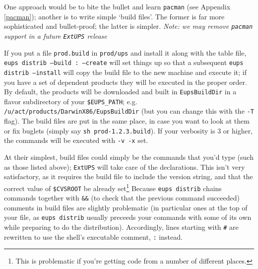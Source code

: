 \documentclass{article}
\newcommand{\code}[1]{\texttt{#1}}
\newcommand{\eups}{\code{ExtUPS}}
\newcommand{\pacman}{\code{pacman}}
\begin{document}
One approach would be to bite the bullet and learn \pacman{} (see Appendix \ref{pacman});
another is to write simple `build files'.  The former is far more sophisticated
and bullet-proof; the latter is simpler.
\textit{Note: we may remove \pacman{} support in a future \eups{} release}

If you put a file \code{prod.build} in \code{prod/ups} and install it along
with the table file, \code{eups distrib --build : --create} will set things up
so that a subsequent \code{eups distrib --install} will copy the build file
to the new machine and execute it;  if you have a set of dependent products
they will be executed in the proper order.  By default, the products will be downloaded
and built in \code{EupsBuildDir} in a flavor subdirectory of your \code{\$EUPS\_PATH};
e.g. \code{/u/act/products/DarwinX86/EupsBuildDir} (but you can change this with
the \code{-T} flag). The build files are put in the same place, in case you want
to look at them or fix buglets (simply say \code{sh prod-1.2.3.build}).  If your
verbosity is 3 or higher, the commands will be executed with \code{-v -x} set.

At their simplest, build files could simply
be the commands that you'd type (such as those listed above); \eups{} will take
care of the declarations.  This isn't very satisfactory, as it requires the
build file to include the version string, and that the correct value of \code{\$CVSROOT}
be already set\footnote{This is problematic if you're getting code from a number
  of different places.}
Because \code{eups distrib} chains commands together with \code{\&\&} (to check
that the previous command succeeded) comments in build files are slightly
problematic (in particular ones at the top of your file, as \code{eups distrib}
usually preceeds your commands with some of its own while preparing to do
the distribution).  Accordingly, lines starting with \code{\#} are rewritten
to use the shell's executable comment, \code{:} instead.
\end{document}

